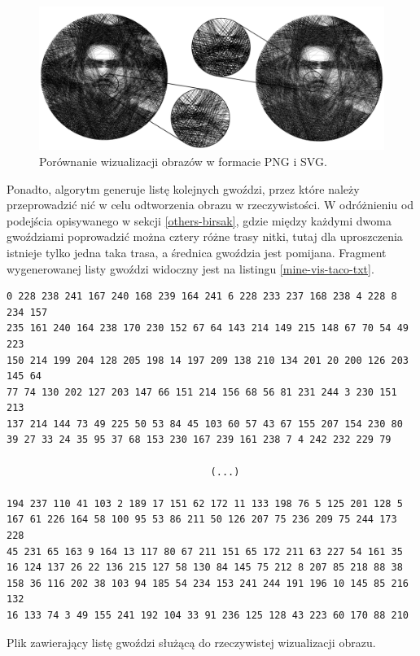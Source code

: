     \begin{figure}[htb]
        \centering
        \includegraphics[width=\textwidth,keepaspectratio]{img/4-mine/taco-vis/taco-v-vs-r.png}
        \caption{Porównanie wizualizacji obrazów w formacie PNG i SVG.}
        \label{mine-vis-taco-png-svg}
    \end{figure}
    
    Ponadto, algorytm generuje listę kolejnych gwoździ, przez które należy przeprowadzić nić w celu odtworzenia obrazu w rzeczywistości. W odróżnieniu od podejścia opisywanego w sekcji \ref{others-birsak}, gdzie między każdymi dwoma gwoździami poprowadzić można cztery różne trasy nitki, tutaj dla uproszczenia istnieje tylko jedna taka trasa, a średnica gwoździa jest pomijana. Fragment wygenerowanej listy gwoździ widoczny jest na listingu \ref{mine-vis-taco-txt}.
   
    \begin{code}[htb]
    \begin{lstlisting}
0 228 238 241 167 240 168 239 164 241 6 228 233 237 168 238 4 228 8 234 157 
235 161 240 164 238 170 230 152 67 64 143 214 149 215 148 67 70 54 49 223 
150 214 199 204 128 205 198 14 197 209 138 210 134 201 20 200 126 203 145 64 
77 74 130 202 127 203 147 66 151 214 156 68 56 81 231 244 3 230 151 213 
137 214 144 73 49 225 50 53 84 45 103 60 57 43 67 155 207 154 230 80 
39 27 33 24 35 95 37 68 153 230 167 239 161 238 7 4 242 232 229 79 

                                   (...)
                                   
194 237 110 41 103 2 189 17 151 62 172 11 133 198 76 5 125 201 128 5 
167 61 226 164 58 100 95 53 86 211 50 126 207 75 236 209 75 244 173 228 
45 231 65 163 9 164 13 117 80 67 211 151 65 172 211 63 227 54 161 35 
16 124 137 26 22 136 215 127 58 130 84 145 75 212 8 207 85 218 88 38 
158 36 116 202 38 103 94 185 54 234 153 241 244 191 196 10 145 85 216 132 
16 133 74 3 49 155 241 192 104 33 91 236 125 128 43 223 60 170 88 210 
    \end{lstlisting}
    \caption{Plik zawierający listę gwoździ służącą do rzeczywistej wizualizacji obrazu.}
    \label{mine-vis-taco-txt}
    \end{code}
    
